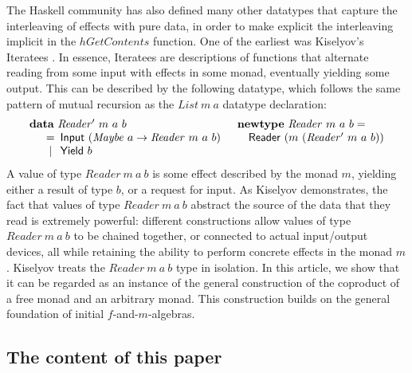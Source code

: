 \documentclass{jfp1}
\newcommand{\kw}[1]{\textbf{#1}}
\begin{document}
The Haskell community
has also defined many other datatypes that
capture the interleaving of effects with pure data, in order to make
explicit the interleaving implicit in the $\mathit{hGetContents}$
function. One of the earliest was Kiselyov's Iteratees
\cite{kiselyov12iteratees}. In essence, Iteratees are descriptions of
functions that alternate reading from some input with effects in some
monad, eventually yielding some output. This can be described by the
following datatype, which follows the same pattern of mutual recursion
as the $\mathit{List}~m~a$ datatype declaration:
\begin{displaymath}
  \begin{array}{ll}
    \kw{data}~\mathit{Reader'}~m~a~b
    &
    \kw{newtype}~\mathit{Reader}~m~a~b = 
    \\
    \quad
    \begin{array}[t]{c@{\hspace{0.5em}}l}
      = & \mathsf{Input}~(\mathit{Maybe}~a \to \mathit{Reader}~m~a~b) \\
      | & \mathsf{Yield}~b
    \end{array}
    &
    \quad \mathsf{Reader}~(m~(\mathit{Reader'}~m~a~b))
  \end{array}
\end{displaymath}
A value of type $\mathit{Reader}~m~a~b$ is some effect described by
the monad $m$, yielding either a result of type $b$, or a request for
input. As Kiselyov demonstrates, the fact that values of type
$\mathit{Reader}~m~a~b$ abstract the source of the data that they read
is extremely powerful: different constructions allow values of type
$\mathit{Reader}~m~a~b$ to be chained together, or connected to actual
input/output devices, all while retaining the ability to perform
concrete effects in the monad $m$.  Kiselyov treats the
$\mathit{Reader}~m~a~b$ type in isolation. In this article, we show
that it can be regarded as an instance of the general construction of
the coproduct of a free monad and an arbitrary monad. This
construction builds on the general foundation of initial
$f$-and-$m$-algebras.

\subsection{The content of this paper}
\end{document}
